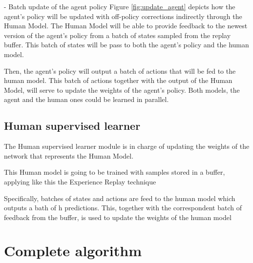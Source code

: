 - Batch update of the agent policy
Figure \ref{fig:update_agent} depicts how the agent's policy will be updated with off-policy corrections indirectly through the Human Model. The Human Model will be able to provide feedback to the newest version of the agent’s policy from a batch of states sampled from the replay buffer. This batch of states will be pass to both the agent's policy and the human model. 

Then, the agent's policy will output a batch of actions that will be fed to the human model. This batch of actions together with the output of the Human Model, will serve to update the weights of the agent's policy. Both models, the agent and the human ones could be learned in parallel.



\subsection*{Human supervised learner}

The Human supervised learner module is in charge of updating the weights of the network that represents the Human Model. 

This Human model is going to be trained with samples stored in a buffer, applying like this the Experience Replay technique

Specifically, batches of states and actions are feed to the human model which outputs a bath of h predictions. 
This, together with the correspondent batch of feedback from the buffer, is used to update the weights of the human model






\section{Complete algorithm}


\label{section:Complete algorithm}


